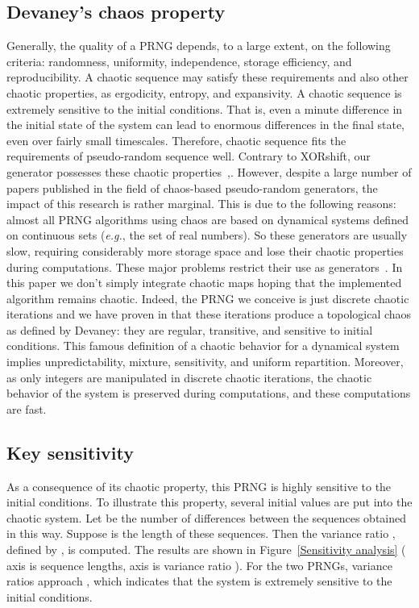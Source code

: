 \documentclass[10pt, a4paper, conference, compsocconf]{IEEEtran}
\begin{document}
\subsection{Devaney's chaos property}
Generally, the quality of a PRNG depends, to a large extent, on the following criteria: randomness, uniformity, independence, storage efficiency, and reproducibility. A chaotic sequence may satisfy these requirements and also other chaotic properties, as ergodicity, entropy, and expansivity. A chaotic sequence is extremely sensitive to the initial conditions. That is, even a minute difference in the initial state of the system can lead to enormous differences in the final state, even over fairly small timescales. Therefore, chaotic sequence fits the requirements of pseudo-random sequence well. Contrary to XORshift, our generator possesses these chaotic properties~\cite{guyeux09},\cite{wang2009}.
However, despite a large number of papers published in the field of chaos-based pseudo-random generators, the impact of this research is rather marginal. This is due to the following reasons: almost all PRNG algorithms using chaos are based on dynamical systems defined on continuous sets (\emph{e.g.}, the set of real numbers). So these generators are usually slow, requiring considerably more storage space and lose their chaotic properties during computations. These major problems restrict their use as generators~\cite{Kocarev2001}.\newline
In this paper we don't simply integrate chaotic maps hoping that the implemented algorithm remains chaotic. Indeed, the PRNG we conceive is just discrete chaotic iterations and we have proven in \cite{guyeux09} that these iterations produce a topological chaos as defined by Devaney: they are regular, transitive, and sensitive to initial conditions. This famous definition of a chaotic behavior for a dynamical system implies unpredictability, mixture, sensitivity, and uniform repartition. Moreover, as only integers are manipulated in discrete chaotic iterations, the chaotic behavior of the system is preserved during computations, and these computations are fast.


\subsection{Key sensitivity}
As a consequence of its chaotic property, this PRNG is highly sensitive to the initial conditions. To illustrate this property, several initial values are put into the chaotic system. Let  be the number 
of differences between the sequences obtained in this way. Suppose  is the length of these 
sequences. Then the variance ratio , defined by , is computed. The results are 
shown in Figure~\ref{Sensitivity analysis} ( axis is sequence lengths,  axis is variance ratio ). For the two PRNGs, variance 
ratios approach , which indicates that the system is extremely sensitive to the initial 
conditions.
\end{document}
